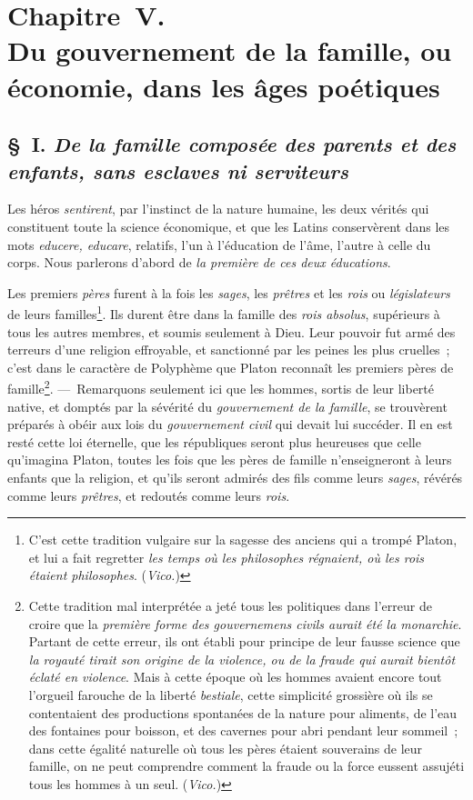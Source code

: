 \documentclass[french,twoside]{book} %
\newcommand\chapteropen{} %
\newcommand\chaptercont{} %
\begin{document}
\chapteropen
\chapter[{Chapitre V. Du gouvernement de la famille, ou économie, dans les âges poétiques}]{Chapitre V. \\
Du gouvernement de la famille, ou économie, dans les âges poétiques}

\chaptercont
\section[{§ I. De la famille composée des parents et des enfants, sans esclaves ni serviteurs}]{§ I. {\itshape De la famille composée des parents et des enfants, sans esclaves ni serviteurs}}
\noindent  Les héros {\itshape sentirent}, par l’instinct de la nature humaine, les deux vérités qui constituent toute la science économique, et que les Latins conservèrent dans les mots {\itshape educere, educare}, relatifs, l’un à l’éducation de l’âme, l’autre à celle du corps. Nous parlerons d’abord de {\itshape la première de ces deux éducations}.\par
Les premiers {\itshape pères} furent à la fois les {\itshape sages}, les {\itshape prêtres} et les {\itshape rois} ou {\itshape législateurs} de leurs familles\footnote{C’est cette tradition vulgaire sur la sagesse des anciens qui a trompé Platon, et lui a fait regretter \emph{{\itshape les temps où les philosophes régnaient, où les rois étaient philosophes}}. ({\itshape Vico.})}. Ils durent être dans la famille des {\itshape rois absolus}, supérieurs à tous les autres membres, et soumis seulement  à Dieu. Leur pouvoir fut armé des terreurs d’une religion effroyable, et sanctionné par les peines les plus cruelles ; c’est dans le caractère de Polyphème que Platon reconnaît les premiers pères de famille\footnote{Cette tradition mal interprétée a jeté tous les politiques dans l’erreur de croire que la {\itshape première forme des gouvernemens civils aurait été la monarchie}. Partant de cette erreur, ils ont établi pour principe de leur fausse science que {\itshape la royauté tirait son origine de la violence, ou de la fraude qui aurait bientôt éclaté en violence}. Mais à cette époque où les hommes avaient encore tout l’orgueil farouche de la liberté {\itshape bestiale}, cette simplicité grossière où ils se contentaient des productions spontanées de la nature pour aliments, de l’eau des fontaines pour boisson, et des cavernes pour abri pendant leur sommeil ; dans cette égalité naturelle où tous les pères étaient souverains de leur famille, on ne peut comprendre comment la fraude ou la force eussent assujéti tous les hommes à un seul. ({\itshape Vico.})}. — Remarquons seulement ici que les hommes, sortis de leur liberté native, et domptés par la sévérité du {\itshape gouvernement de la famille}, se trouvèrent préparés à obéir aux lois du {\itshape gouvernement civil} qui devait lui succéder. Il en est resté cette loi éternelle, que les républiques seront plus heureuses que celle qu’imagina Platon, toutes les fois que les pères de famille n’enseigneront à leurs enfants que la religion, et qu’ils seront admirés des fils comme leurs {\itshape sages}, révérés comme leurs {\itshape prêtres}, et redoutés comme leurs {\itshape rois}.\par
\end{document}
